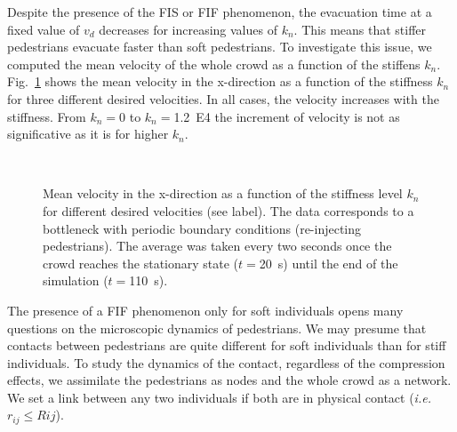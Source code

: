 \documentclass[preprint,12pt]{elsarticle}
\begin{document}
Despite the presence of the FIS or FIF phenomenon, the evacuation time at a fixed value of $v_d$ decreases for increasing values of $k_n$. This means that stiffer pedestrians evacuate faster than soft pedestrians. To investigate this issue, we computed the mean velocity of the whole crowd as a function of the stiffens $k_n$. Fig.~\ref{kn_vs_vx_bottleneck} shows the mean velocity in the x-direction as a function of the stiffness $k_n$ for three different desired velocities. In all cases, the velocity increases with the stiffness. From $k_n=0$ to $k_n=$1.2~E4 the increment of velocity is not as significative as it is for higher $k_n$. \\


\begin{figure}[!htbp]
\centering
    \\
\caption[width=0.47\columnwidth]{Mean velocity in the x-direction as a function of the stiffness level $k_n$ for different desired velocities (see label). The data corresponds to a bottleneck with periodic boundary conditions (re-injecting pedestrians). The average was taken every two seconds once the crowd reaches the stationary state ($t=$20~s) until the end of the simulation ($t=$110~s). }
\label{kn_vs_vx_bottleneck}
\end{figure}


The presence of a FIF phenomenon only for soft individuals opens many questions on the microscopic dynamics of pedestrians. We may presume that contacts between pedestrians are quite different for soft individuals than for stiff individuals. To study the dynamics of the contact, regardless of the compression effects, we assimilate the pedestrians as nodes and the whole crowd as a network. We set a link between any two individuals if both are in physical contact (\textit{i.e.} $r_{ij} \leq R{ij}$).\\
\end{document}
